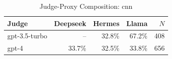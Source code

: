\begin{table}[htbp]
\centering
\caption{Judge-Proxy Composition: cnn}
\label{tab:composition_cnn}
\begin{tabular}{lrrrr}
\toprule
Judge & Deepseek & Hermes & Llama & $N$ \\
\midrule
gpt-3.5-turbo & -- & 32.8\% & 67.2\% & 408 \\
gpt-4 & 33.7\% & 32.5\% & 33.8\% & 656 \\
\bottomrule
\end{tabular}
\end{table}